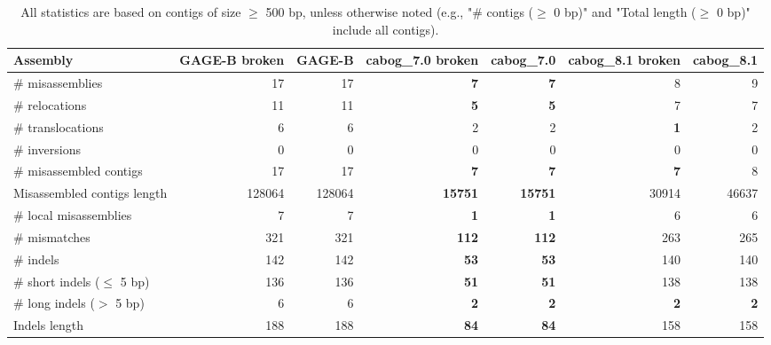 \documentclass[12pt,a4paper]{article}
\begin{document}
\begin{table}[ht]
\begin{center}
\caption{All statistics are based on contigs of size $\geq$ 500 bp, unless otherwise noted (e.g., "\# contigs ($\geq$ 0 bp)" and "Total length ($\geq$ 0 bp)" include all contigs).}
\begin{tabular}{|l*{6}{|r}|}
\hline
Assembly & GAGE-B broken & GAGE-B & cabog\_7.0 broken & cabog\_7.0 & cabog\_8.1 broken & cabog\_8.1 \\ \hline
\# misassemblies & 17 & 17 & {\bf 7} & {\bf 7} & 8 & 9 \\ \hline
\hspace{5mm}\# relocations & 11 & 11 & {\bf 5} & {\bf 5} & 7 & 7 \\ \hline
\hspace{5mm}\# translocations & 6 & 6 & 2 & 2 & {\bf 1} & 2 \\ \hline
\hspace{5mm}\# inversions & 0 & 0 & 0 & 0 & 0 & 0 \\ \hline
\# misassembled contigs & 17 & 17 & {\bf 7} & {\bf 7} & {\bf 7} & 8 \\ \hline
Misassembled contigs length & 128064 & 128064 & {\bf 15751} & {\bf 15751} & 30914 & 46637 \\ \hline
\# local misassemblies & 7 & 7 & {\bf 1} & {\bf 1} & 6 & 6 \\ \hline
\# mismatches & 321 & 321 & {\bf 112} & {\bf 112} & 263 & 265 \\ \hline
\# indels & 142 & 142 & {\bf 53} & {\bf 53} & 140 & 140 \\ \hline
\hspace{5mm}\# short indels ($\leq$ 5 bp) & 136 & 136 & {\bf 51} & {\bf 51} & 138 & 138 \\ \hline
\hspace{5mm}\# long indels ($>$ 5 bp) & 6 & 6 & {\bf 2} & {\bf 2} & {\bf 2} & {\bf 2} \\ \hline
Indels length & 188 & 188 & {\bf 84} & {\bf 84} & 158 & 158 \\ \hline
\end{tabular}
\end{center}
\end{table}
\end{document}
